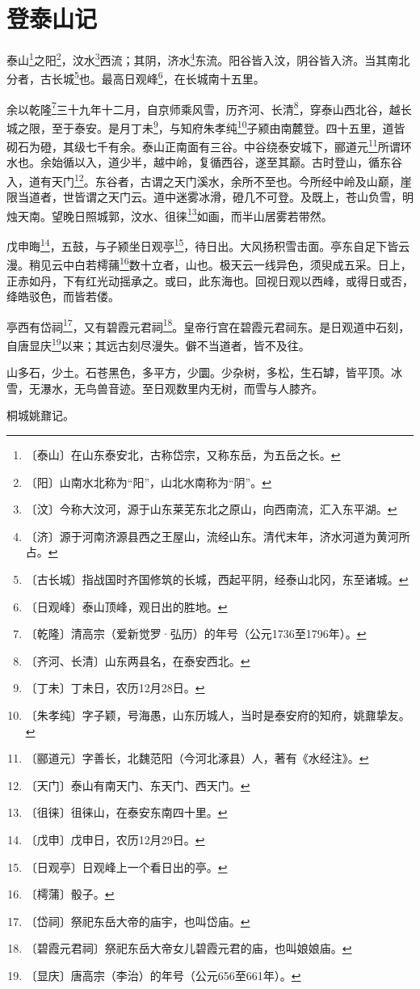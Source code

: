 \documentclass[12pt,UTF-8,openany,a4]{ctexbook}
\begin{document}
\chapter{登泰山记}

\begin{large}
    
    泰山\footnote{〔泰山〕\yiwen 在山东泰安北，古称岱宗，又称东岳，为五岳之长。}之阳\footnote{〔阳〕\yiwen 山南水北称为“阳”，山北水南称为“阴”。}，汶水\footnote{〔汶〕\yiwen 今称大汶河，源于山东莱芜东北之原山，向西南流，汇入东平湖。}西流；其阴，济水\footnote{〔济〕\yiwen 源于河南济源县西之王屋山，流经山东。清代末年，济水河道为黄河所占。}东流。阳谷皆入汶，阴谷皆入济。当其南北分者，古长城\footnote{〔古长城〕\yiwen 指战国时齐国修筑的长城，西起平阴，经泰山北冈，东至诸城。}也。最高日观峰\footnote{〔日观峰〕\yiwen 泰山顶峰，观日出的胜地。}，在长城南十五里。
    
    余以乾隆\footnote{〔乾隆〕\yiwen 清高宗（爱新觉罗·弘历）的年号（公元1736至1796年）。}三十九年十二月，自京师乘风雪，历齐河、长清\footnote{〔齐河、长清〕\yiwen 山东两县名，在泰安西北。}，穿泰山西北谷，越长城之限，至于泰安。是月丁未\footnote{〔丁未〕\yiwen 丁未日，农历12月28日。}，与知府朱孝纯\footnote{〔朱孝纯〕\yiwen 字子颖，号海愚，山东历城人，当时是泰安府的知府，姚鼐挚友。}子颍由南麓登。四十五里，道皆砌石为磴，其级七千有余。泰山正南面有三谷。中谷绕泰安城下，郦道元\footnote{〔郦道元〕\yiwen 字善长，北魏范阳（今河北涿县）人，著有《水经注》。}所谓环水也。余始循以入，道少半，越中岭，复循西谷，遂至其巅。古时登山，循东谷入，道有天门\footnote{〔天门〕\yiwen 泰山有南天门、东天门、西天门。}。东谷者，古谓之天门溪水，余所不至也。今所经中岭及山巅，崖限当道者，世皆谓之天门云。道中迷雾冰滑，磴几不可登。及既上，苍山负雪，明烛天南。望晚日照城郭，汶水、徂徕\footnote{〔徂徕〕\yiwen 徂徕山，在泰安东南四十里。}如画，而半山居雾若带然。
    
    戊申晦\footnote{〔戊申〕\yiwen 戊申日，农历12月29日。}，五鼓，与子颍坐日观亭\footnote{〔日观亭〕\yiwen 日观峰上一个看日出的亭。}，待日出。大风扬积雪击面。亭东自足下皆云漫。稍见云中白若樗蒱\footnote{〔樗蒲〕\yiwen 骰子。}数十立者，山也。极天云一线异色，须臾成五采。日上，正赤如丹，下有红光动摇承之。或曰，此东海也。回视日观以西峰，或得日或否，绛皓驳色，而皆若偻。
    
    亭西有岱祠\footnote{〔岱祠〕\yiwen 祭祀东岳大帝的庙宇，也叫岱庙。}，又有碧霞元君祠\footnote{〔碧霞元君祠〕\yiwen 祭祀东岳大帝女儿碧霞元君的庙，也叫娘娘庙。}。皇帝行宫在碧霞元君祠东。是日观道中石刻，自唐显庆\footnote{〔显庆〕\yiwen 唐高宗（李治）的年号（公元656至661年）。}以来；其远古刻尽漫失。僻不当道者，皆不及往。
    
    山多石，少土。石苍黑色，多平方，少圜。少杂树，多松，生石罅，皆平顶。冰雪，无瀑水，无鸟兽音迹。至日观数里内无树，而雪与人膝齐。
    
    桐城姚鼐记。
\end{large}
\end{document}
